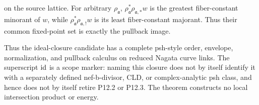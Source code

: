\begin{theorem}
\begin{enumerate}
      on the source lattice.  For arbitrary \(\rho_{\mathfrak a}\),
      \(\rho_{\mathfrak a}^*\rho_{\mathfrak a,*}w\) is the greatest
      fiber-constant minorant of \(w\), while
      \(\rho_{\mathfrak a}^*\rho_{\mathfrak a,!}w\) is its least
      fiber-constant majorant.  Thus their common fixed-point set is exactly
      the pullback image.
\end{enumerate}
Thus the ideal-closure candidate has a complete psh-style order, envelope,
normalization, and pullback calculus on reduced Nagata curve links.  The
superscript \({\rm id}\) is a scope marker: naming this closure does not by
itself identify it with a separately defined nef-b-divisor, CLD, or
complex-analytic psh class, and hence does not by itself retire P12.2 or
P12.3.  The theorem constructs no local intersection product or energy.
\end{theorem}

